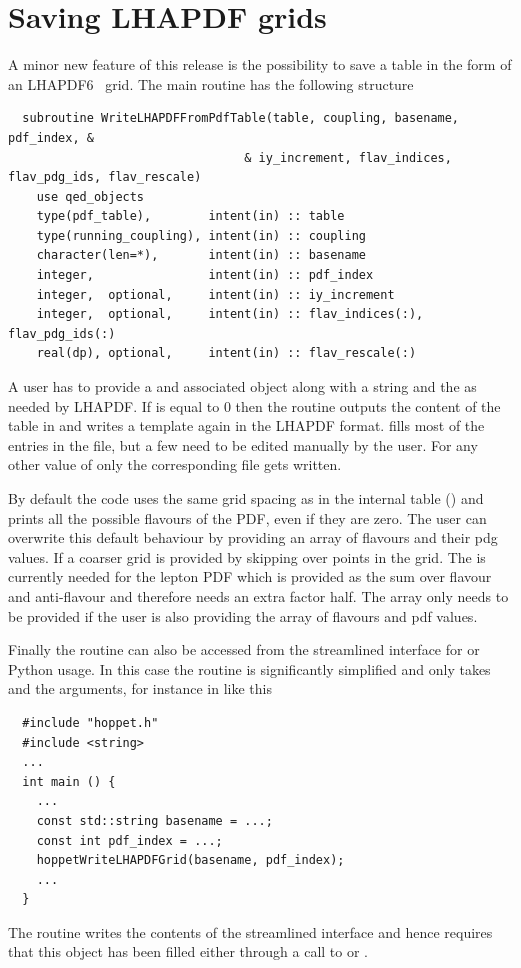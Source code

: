 \section{Saving LHAPDF grids}
\label{sec:lhapdf}
A minor new feature of this release is the possibility to save a
\hoppet{} table in the form of an LHAPDF6~\cite{LHAPDF} grid.
The main routine has the following structure
\begin{lstlisting}
  subroutine WriteLHAPDFFromPdfTable(table, coupling, basename, pdf_index, &
                                 & iy_increment, flav_indices, flav_pdg_ids, flav_rescale)                                
    use qed_objects
    type(pdf_table),        intent(in) :: table
    type(running_coupling), intent(in) :: coupling
    character(len=*),       intent(in) :: basename
    integer,                intent(in) :: pdf_index
    integer,  optional,     intent(in) :: iy_increment
    integer,  optional,     intent(in) :: flav_indices(:), flav_pdg_ids(:)
    real(dp), optional,     intent(in) :: flav_rescale(:)
\end{lstlisting}
A user has to provide a  and associated 
object along with a string  and the  as
needed by LHAPDF.
%
If  is equal to 0 then the routine
outputs the content of the table in  and
writes a template  again in the LHAPDF
format.
%
\hoppet{} fills most of the entries in the 
file, but a few need to be edited manually by the user.
%
For any other value of  only the corresponding
 file gets written.

By default the code uses the same grid spacing as in the internal
\hoppet{} table () and prints all the possible
flavours of the PDF, even if they are zero.
%
The user can overwrite
this default behaviour by providing an array of flavours and their pdg
values.
%
If  a coarser grid is provided by
skipping over  points in the grid. The
 is currently needed for the lepton PDF which is
provided as the sum over flavour and anti-flavour and therefore needs
an extra factor half.
%
The  array only needs to be
provided if the user is also providing the array of flavours and pdf
values.

Finally the routine can also be accessed from the streamlined
interface for \CPP{} or Python usage. In this case the routine is
significantly simplified and only takes  and the
 arguments, for instance in \CPP{} like this
\begin{lstlisting}
  #include "hoppet.h"
  #include <string>
  ...
  int main () {
    ...
    const std::string basename = ...;
    const int pdf_index = ...;
    hoppetWriteLHAPDFGrid(basename, pdf_index);
    ...
  }
\end{lstlisting}
The routine writes the contents of the streamlined interface
 and hence requires that this object has been filled
either through a call to  or .

